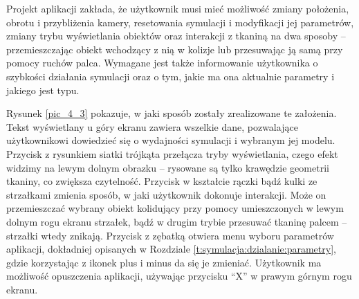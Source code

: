 		
		
		Projekt aplikacji zakłada, że użytkownik musi mieć możliwość zmiany położenia, obrotu i przybliżenia kamery, resetowania symulacji i modyfikacji jej parametrów, zmiany trybu wyświetlania obiektów oraz interakcji z tkaniną na dwa sposoby -- przemieszczając obiekt wchodzący z nią w kolizje lub przesuwając ją samą przy pomocy ruchów palca. Wymagane jest także informowanie użytkownika o szybkości działania symulacji oraz o tym, jakie ma ona aktualnie parametry i jakiego jest typu.
		
		Rysunek \ref{pic_4_3} pokazuje, w jaki sposób zostały zrealizowane te założenia. Tekst wyświetlany u góry ekranu zawiera wszelkie dane, pozwalające użytkownikowi dowiedzieć się o wydajności symulacji i wybranym jej modelu. Przycisk z rysunkiem siatki trójkąta przełącza tryby wyświetlania, czego efekt widzimy na lewym dolnym obrazku -- rysowane są tylko krawędzie geometrii tkaniny, co zwiększa czytelność. Przycisk w kształcie rączki bądź kulki ze strzałkami zmienia sposób, w jaki użytkownik dokonuje interakcji. Może on przemieszczać wybrany obiekt kolidujący przy pomocy umieszczonych w lewym dolnym rogu ekranu strzałek, bądź w drugim trybie przesuwać tkaninę palcem -- strzałki wtedy znikają. Przycisk z zębatką otwiera menu wyboru parametrów aplikacji, dokładniej opisanych w Rozdziale \ref{t:symulacja:dzialanie:parametry}, gdzie korzystając z ikonek plus i minus da się je zmieniać. Użytkownik ma możliwość opuszczenia aplikacji, używając przycisku ``X'' w prawym górnym rogu ekranu.
